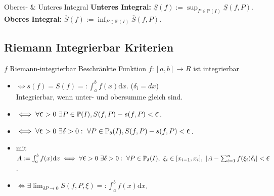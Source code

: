 \documentclass[a4paper]{article}
\let\oldepsilon\epsilon
\renewcommand{\epsilon}{\text{\Large $\oldepsilon$}}
\begin{document}
\begin{subbox}{Oberes- \& Unteres Integral}
    \textbf{Unteres Integral:} $\underline{S}(f) := \sup_{P \in \mathbb{P}(I)} \underline{S}(f, P)$. \\
    \textbf{Oberes Integral:} $\overline{S}(f) := \inf_{P \in \mathbb{P}(I)} \overline{S}(f, P)$.
\end{subbox}  


\subsection{Riemann Integrierbar Kriterien}
\begin{mainbox}{$f$ Riemann-integrierbar}  
Beschränkte Funktion $f:[a,b] \to R$ ist integrierbar
  \begin{itemize}[leftmargin=4.5mm, topsep=1pt, parsep=1pt]
    \item $\iff s(f) = S(f) =: \int_{a}^{b} f(x) \mathrm{d}x$. 
      \tiny \color{gray} ($\delta_i = dx$) \normalsize \color{black} \\
      \tiny \color{gray} Integrierbar, wenn unter- und obersumme gleich sind. \normalsize \color{black}
    \item $\iff \forall \epsilon > 0 \ \exists P \in \mathbb{P}(I), S(f, P) - s(f, P) < \epsilon$.
    \item $\iff \forall \epsilon > 0 \ \exists \delta > 0: \ \forall P \in \mathbb{P}_\delta(I), S(f, P) - s(f, P) < \epsilon$.
    \item mit $A:= \int_{a}^{b} f(x) \mathrm{d}x \iff \forall \epsilon > 0 \ \exists \delta > 0: \ \forall P \in \mathbb{P}_\delta(I), \ \xi_i \in [x_{i-1}, x_i], \ \left| A - \sum_{i=1}^{n} f(\xi_i) \delta_i \right| < \epsilon$.
    \item $\iff \exists \lim_{\delta{P} \to 0} S(f, P, \xi) =: \int_{a}^{b} f(x) \mathrm{d}x$.
  \end{itemize}
\end{mainbox}
\end{document}
